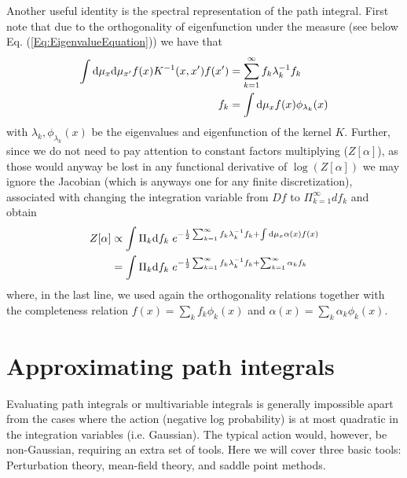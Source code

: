 Another useful identity is the spectral representation of the path integral. First note that due to the orthogonality of eigenfunction under the measure (see below Eq. (\ref{Eq:EigenvalueEquation})) we have that
\begin{align}
 \int \text{d}\mu_x \text{d}\mu_{x'} f(x) K^{-1}(x,x') f(x') &= \sum_{k=1}^{\infty} f_k \lambda_k^{-1} f_k \\ \nonumber 
f_k &= \int \text{d}\mu_x f(x) \phi_{\lambda_k}(x)
\end{align}
with $\lambda_k, \phi_{\lambda_k}(x)$ be the eigenvalues and eigenfunction of the kernel $K$. Further, since we do not need to pay attention to constant factors multiplying ($Z[\alpha]$), as those would anyway be lost in any functional derivative of $\log(Z[\alpha])$ we may ignore the Jacobian (which is anyways one for any finite discretization), associated with changing the integration variable from $Df$ to $\Pi_{k=1}^{\infty}d f_k$ and obtain 
\begin{align}
Z[\alpha] &\propto \int \Pi_k \text{d} f_k \; e^{-\frac{1}{2}\sum_{k=1}^{\infty} f_k \lambda_k^{-1} f_k + \int \text{d}\mu_x \alpha(x) f(x)} \\ \nonumber 
&= \int \Pi_k \text{d} f_k \; e^{-\frac{1}{2}\sum_{k=1}^{\infty} f_k \lambda_k^{-1} f_k + \sum_{k=1}^{\infty} \alpha_k f_k}
\end{align}
where, in the last line, we used again the orthogonality relations together with the completeness relation $f(x) = \sum_k f_k \phi_k(x)$ and $\alpha(x) = \sum_k \alpha_k \phi_k(x)$.

\section{Approximating path integrals}
Evaluating path integrals or multivariable integrals is generally impossible apart from the cases where the action (negative log probability) is at most quadratic in the integration variables (i.e. Gaussian). The typical action would, however, be non-Gaussian, requiring an extra set of tools. Here we will cover three basic tools: Perturbation theory, mean-field theory, and saddle point methods.  


